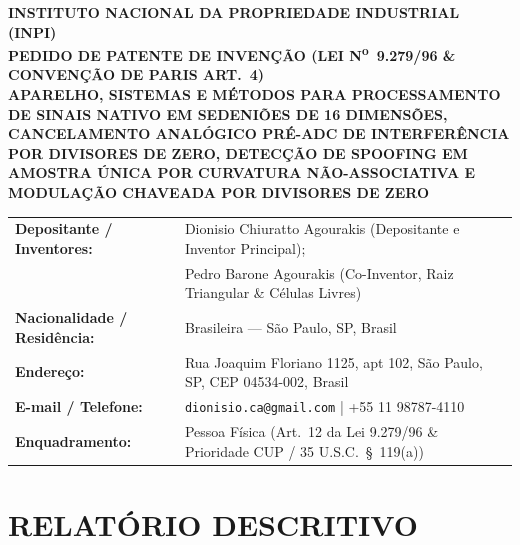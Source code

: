 \documentclass[12pt,a4paper]{article}
\begin{document}
\begin{center}
    {\large \textbf{INSTITUTO NACIONAL DA PROPRIEDADE INDUSTRIAL (INPI)\\PEDIDO DE PATENTE DE INVEN\c{C}\~AO (LEI N\textsuperscript{o}\ 9.279/96 \& CONVEN\c{C}\~AO DE PARIS ART.\ 4)}}\\[8pt]
    {\LARGE \textbf{APARELHO, SISTEMAS E M\'ETODOS PARA PROCESSAMENTO DE SINAIS NATIVO EM SEDENI\~OES DE 16 DIMENS\~OES, CANCELAMENTO ANAL\'OGICO PR\'E-ADC DE INTERFER\^ENCIA POR DIVISORES DE ZERO, DETEC\c{C}\~AO DE SPOOFING EM AMOSTRA \'UNICA POR CURVATURA N\~AO-ASSOCIATIVA E MODULA\c{C}\~AO CHAVEADA POR DIVISORES DE ZERO}}\\[10pt]
\end{center}

\begin{tabular}{@{}p{2.2in}p{3.9in}@{}}
\toprule
\textbf{Depositante / Inventores:} & Dionisio Chiuratto Agourakis (Depositante e Inventor Principal);\\
 & Pedro Barone Agourakis (Co-Inventor, Raiz Triangular \& C\'elulas Livres) \\
\textbf{Nacionalidade / Resid\^encia:} & Brasileira --- S\~ao Paulo, SP, Brasil \\
\textbf{Endere\c{c}o:} & Rua Joaquim Floriano 1125, apt 102, S\~ao Paulo, SP, CEP 04534-002, Brasil \\
\textbf{E-mail / Telefone:} & \texttt{dionisio.ca@gmail.com} \quad | \quad +55 11 98787-4110 \\
\textbf{Enquadramento:} & Pessoa F\'isica (Art.\ 12 da Lei 9.279/96 \& Prioridade CUP / 35 U.S.C.\ \S\ 119(a)) \\
\bottomrule
\end{tabular}

\section*{RELAT\'ORIO DESCRITIVO}
\end{document}
